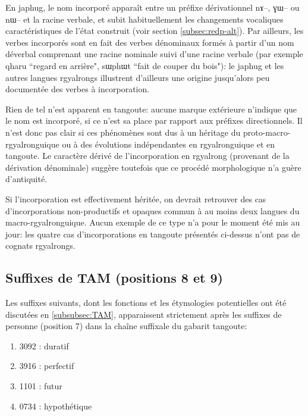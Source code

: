 \documentclass[oldfontcommands,twoside,a4paper,11pt,draft]{memoir}
\newcommand{\ipa}[1]{{\phon #1}} %
\newcommand{\tgz}[1]{#1 \mo{#1} \tg{#1}}
\begin{document}
En japhug, le nom incorporé apparaît entre un préfixe dérivationnel {\ipa{nɤ--},} \ipa{ɣɯ--} ou \ipa{nɯ--} et la racine verbale, et subit habituellement les changements vocaliques caractéristiques de l'état construit (voir section \ref{subsec:redp-alt}).  Par ailleurs, les verbes incorporés sont en fait des verbes dénominaux formés à partir d'un nom déverbal comprenant une racine nominale suivi d'une racine verbale (par exemple \ipa{qharu} ``regard en arrière", \ipa{sɯphɯt} ``fait de couper du bois"): le japhug et les autres langues rgyalrongs illustrent d'ailleurs une origine jusqu'alors peu documentée des verbes à incorporation.

Rien de tel n'est apparent en tangoute: aucune marque extérieure n'indique que le nom est incorporé, si ce n'est sa place par rapport aux préfixes directionnels. Il n'est donc pas clair si ces phénomènes sont dus à un héritage du proto-macro-rgyalronguique ou à des évolutions indépendantes en rgyalronguique et en tangoute. Le caractère dérivé de l'incorporation en rgyalrong (provenant de la dérivation dénominale) suggère toutefois que ce procédé morphologique n'a guère d'antiquité.

Si l'incorporation est effectivement héritée, on devrait retrouver des cas d'incorporations non-productifs et opaques commun à au moins deux langues du macro-rgyalronguique. Aucun exemple de ce type n'a pour le moment été mis au jour: les quatre cas d'incorporations en tangoute présentés ci-dessus n'ont pas de cognats rgyalrongs. 

\subsection{Suffixes de TAM (positions 8 et 9)} \label{subsec:position8}

Les suffixes suivants, dont les fonctions et les étymologies potentielles ont été discutées en \ref{subsubsec:TAM}, apparaissent strictement après les suffixes de personne (position 7) dans la chaîne suffixale du gabarit tangoute:
 
\begin{enumerate}
 
\item \tgz{3092}: duratif
\item \tgz{3916}: perfectif
\item \tgz{1101}: futur 
\item \tgz{0734}: hypothétique
\end{enumerate}
\end{document}
